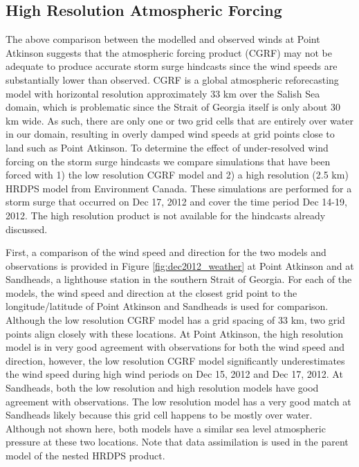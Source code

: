 \documentclass[letterpaper]{tATO2e}
\begin{document}
\subsection{High Resolution Atmospheric Forcing}\label{sec:res}
The above comparison between the modelled and observed winds at Point Atkinson suggests that the atmospheric forcing product (CGRF) may not be adequate to produce accurate storm surge hindcasts since the wind speeds are substantially lower than observed. CGRF is a global atmospheric reforecasting model with horizontal resolution approximately 33 km over the Salish Sea domain, which is problematic since the Strait of Georgia itself is only about 30 km wide. As such, there are only one or two grid cells that are entirely over water in our domain, resulting in overly damped wind speeds at grid points close to land such as Point Atkinson. To determine the effect of under-resolved wind forcing on the storm surge hindcasts we compare simulations that have been forced with 1) the low resolution CGRF model and 2) a high resolution (2.5 km) HRDPS model from Environment Canada.  These simulations are performed for a storm surge that occurred on Dec 17, 2012 and cover the time period Dec 14-19, 2012. The high resolution product is not available for the hindcasts already discussed. 

First, a comparison of the wind speed and direction for the two models and observations is provided in Figure \ref{fig:dec2012_weather} at Point Atkinson and at Sandheads, a lighthouse station in the southern Strait of Georgia. For each of the models, the wind speed and direction at the closest grid point to the longitude/latitude of Point Atkinson and Sandheads is used for comparison. Although the low resolution CGRF model has a grid spacing of 33 km, two grid points align closely with these locations. At Point Atkinson, the high resolution model is in very good agreement with observations for both the wind speed and direction, however, the low resolution CGRF model significantly underestimates the wind speed during high wind periods on Dec 15, 2012 and Dec 17, 2012. At Sandheads, both the low resolution and high resolution models have good agreement with observations. The low resolution model has a very good match at Sandheads likely because this grid cell happens to be mostly over water. Although not shown here, both models have a similar sea level atmospheric pressure at these two locations. Note that data assimilation is used in the parent model of the nested HRDPS product.
\end{document}
